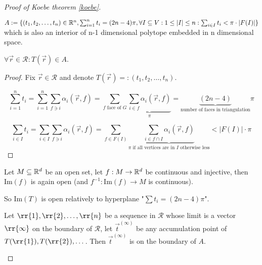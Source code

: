 \begin{proof}[Proof of Koebe theorem \ref{koebe}]
	\begin{defn}
		$A := \{(t_1, t_2, \dots, t_n) \in \mathbb{R}^n, \sum_{i = 1}^n t_i = (2n-4)\pi, \forall I \subseteq V : 1 \leq |I| \leq n: \sum_{i \in I} t_i < \pi \cdot |F(I)|\}$ which is also an interior of n-1 dimensional polytope embedded in n dimensional space.
	\end{defn}

	\begin{lemma}[\ref{koebe-first-b}]
		$\forall \overrightarrow{r} \in \mathcal{R} : T(\overrightarrow{r}) \in A$.
	\end{lemma}

	\begin{proof}
		Fix $\overrightarrow{r} \in \mathcal{R}$ and denote $T(\overrightarrow{r}) =: (t_1, t_2, \dots, t_n)$.
		
		$$
		\sum_{i = 1}^{n} t_i = \sum_{i = 1}^n \sum_{f \ni i} \alpha_i (\overrightarrow{r}, f) = \sum_{f \text{ face of } G} \underbrace{\sum_{i \in f} \alpha_i (\overrightarrow{r}, f)}_{\pi} = \underbrace{(2n-4)}_{\text{number of faces in triangulation}} \pi
		$$
		
		$$
		\sum_{i \in I} t_i = \sum_{i \in I} \sum_{f \ni i} \alpha_i (\overrightarrow{r}, f) = \sum_{f \in F(I)} \underbrace{\sum_{i \in f \cap I} \alpha_i (\overrightarrow{r}, f)}_{\pi \text{ if all vertices are in } I \text{ otherwise less}} < |F(I)| \cdot \pi
		$$
	\end{proof}

	\begin{fact}
		Let $M \subseteq \mathbb{R}^d$ be an open set, let $f : M \to \mathbb{R}^d$ be continuous and injective, then $\text{Im}(f)$ is again open (and $f^{-1} : \text{Im}(f) \to M$ is continuous).
	\end{fact}

	\noindent So $\text{Im}(T)$ is open relatively to hyperplane "$\sum t_i = (2n-4)\pi$".
	
	\begin{lemma}
		Let $\rr{1}, \rr{2}, \dots, \rr{n}$ be a sequence in $\mathcal{R}$ whose limit is a vector $\rr{\infty}$ on the boundary of $\mathcal{R}$, let $\overrightarrow{t}^{(\infty)}$ be any accumulation point of $T(\rr{1}), T(\rr{2}), \dots$. Then $\overrightarrow{t}^{(\infty)}$ is on the boundary of $A$.
	\end{lemma}


\end{proof}
